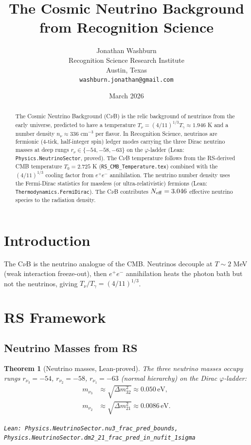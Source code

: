 \documentclass[12pt,a4paper]{article}
\title{The Cosmic Neutrino Background\\
from Recognition Science}
\author{Jonathan Washburn\\
Recognition Science Research Institute\\
Austin, Texas\\
\texttt{washburn.jonathan@gmail.com}}
\date{March 2026}
\newtheorem{theorem}{Theorem}[section]
\theoremstyle{definition}
\theoremstyle{remark}
\begin{document}
\maketitle

\begin{abstract}
The Cosmic Neutrino Background (C$\nu$B) is the relic background of
neutrinos from the early universe, predicted to have a temperature
$T_\nu = (4/11)^{1/3} T_\gamma \approx 1.946$ K and a number density
$n_\nu \approx 336$ cm$^{-3}$ per flavor.  In Recognition Science,
neutrinos are fermionic (4-tick, half-integer spin) ledger modes carrying
the three Dirac neutrino masses at deep rungs $r_\nu \in \{-54, -58, -63\}$
on the $\varphi$-ladder (Lean: \texttt{Physics.NeutrinoSector}, proved).
The C$\nu$B temperature follows from the RS-derived CMB temperature
$T_0 = 2.725$ K (\texttt{RS\_CMB\_Temperature.tex}) combined with the
$(4/11)^{1/3}$ cooling factor from $e^+e^-$ annihilation.  The neutrino
number density uses the Fermi-Dirac statistics for massless (or
ultra-relativistic) fermions (Lean: \texttt{Thermodynamics.FermiDirac}).
The C$\nu$B contributes $N_{\rm eff} = 3.046$ effective neutrino species
to the radiation density.
\end{abstract}

\section{Introduction}

The C$\nu$B is the neutrino analogue of the CMB.  Neutrinos decouple
at $T \sim 2$ MeV (weak interaction freeze-out), then $e^+e^-$
annihilation heats the photon bath but not the neutrinos, giving
$T_\nu/T_\gamma = (4/11)^{1/3}$.

\section{RS Framework}

\subsection{Neutrino Masses from RS}

\begin{theorem}[Neutrino masses, Lean-proved]\label{thm:nu_mass}
The three neutrino masses occupy rungs $r_{\nu_3} = -54$, $r_{\nu_2} = -58$,
$r_{\nu_1} = -63$ (normal hierarchy) on the Dirac $\varphi$-ladder:
\begin{align}
  m_{\nu_3} &\approx \sqrt{\Delta m^2_{32}} \approx 0.050\,\text{eV}, \\
  m_{\nu_2} &\approx \sqrt{\Delta m^2_{21}} \approx 0.0086\,\text{eV}.
\end{align}

\texttt{Lean: Physics.NeutrinoSector.nu3\_frac\_pred\_bounds,}\\
\texttt{Physics.NeutrinoSector.dm2\_21\_frac\_pred\_in\_nufit\_1sigma}
\end{theorem}
\end{document}
